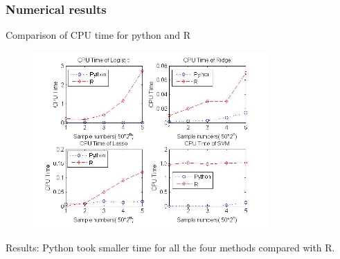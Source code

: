 \documentclass[xcolor={x11names,svgnames,dvipsnames}]{beamer}
\begin{document}
\begin{frame}
\frametitle{Numerical results}
\begin{block}{Comparison of CPU time for python and R }
\begin{center}
 \begin{figure}
     \includegraphics[width=0.8\textwidth, height=0.7\textheight]{cputime_python_r.jpg}

    \end{figure}
\end{center}
\end{block}

\begin{block}{Results:}
Python took smaller time for all the four methods compared with R.
\end{block}

\end{frame}
\end{document}
